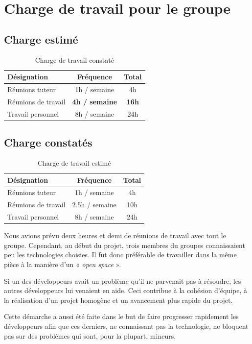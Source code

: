 \documentclass[12pt,a4paper,openany]{article}
\begin{document}
	\section{Charge de travail pour le groupe}
	\subsection{Charge estimé}
	\begin{table}[H]
		\centering
		\begin{tabular}{l|c|c}
			\textbf{Désignation} & \textbf{Fréquence} & \textbf{Total}\\
			\hline
			Réunions tuteur & 1h / semaine & 4h\\
			Réunions de travail & \textbf{4h / semaine} & \textbf{16h}\\
			Travail personnel & 8h / semaine & 24h
		\end{tabular}
		\caption{Charge de travail constaté}
	\end{table}

	\subsection{Charge constatés}
	\begin{table}[H]
		\centering
		\begin{tabular}{l|c|c}
			\textbf{Désignation} & \textbf{Fréquence} & \textbf{Total}\\
			\hline
			Réunions tuteur & 1h / semaine & 4h\\
			Réunions de travail & 2.5h / semaine & 10h\\
			Travail personnel & 8h / semaine & 24h
		\end{tabular}
		\caption{Charge de travail estimé}
	\end{table}
	Nous avions prévu deux heures et demi de réunions de travail avec tout le groupe. Cependant, au début du projet, trois membres du groupes
	connaissaient peu les technologies choisies. Il fut donc préférable de travailler dans la même pièce à la manière d’un « \textit{open space} ». 
	
	Si un des développeurs avait un problème qu'il ne parvenait pas à résoudre, les autres développeurs lui venaient en aide. Ceci contribue à la cohésion
	d'équipe, à la réalisation d’un projet homogène et un avancement plus rapide du projet. 
	
	Cette démarche a aussi été faite dans le but de faire
	progresser rapidement les développeurs afin que ces derniers, ne connaissant pas la technologie, ne bloquent pas sur des problèmes qui sont, pour
	la plupart, mineurs.
\end{document}
